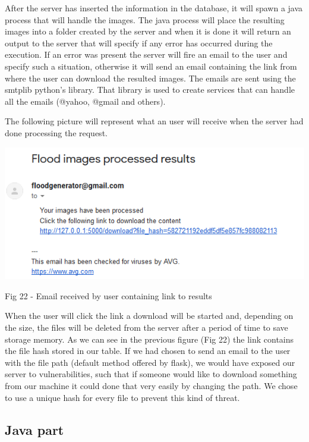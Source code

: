 \documentclass[12pt, a4paper]{report}
\begin{document}
After the server has inserted the information in the database, it will spawn a java process that will handle the images. The java process will place the resulting images into a folder created by the server and when it is done it will return an output to the server that will specify if any error has occurred during the execution. If an error was present the server will fire an email to the user and specify such a situation, otherwise it will send an email containing the link from where the user can download the resulted images. The emails are sent using the smtplib python's library. That library is used to create services that can handle all the emails (@yahoo, @gmail and others).
\par 

The following picture will represent what an user will receive when the server had done processing the request.

\medskip
\includegraphics[scale=1, center]{receive_email.png}
\begin{center}
Fig 22 - Email received by user containing link to results
\end{center}
\par 

When the user will click the link a download will be started and, depending on the size, the files will be deleted from the server after a period of time to save storage memory. As we can see in the previous figure (Fig 22) the link contains the file hash stored in our table. If we had chosen to send an email to the user with the file path (default method offered by flask), we would have exposed our server to vulnerabilities, such that if someone would like to download something from our machine it could done that very easily by changing the path. We chose to use a unique hash for every file to prevent this kind of threat.

\subsection{Java part}
\end{document}
